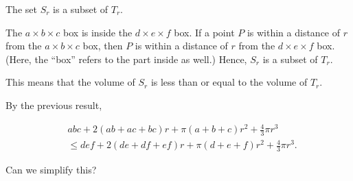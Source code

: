 




The set $S_r$ is a subset of $T_r$.

The $a \times b \times c$ box is inside the $d \times e \times f$ box. If a point $P$ is within a distance of $r$ from the $a \times b \times c$ box, then $P$ is within a distance of $r$ from the $d \times e \times f$ box. (Here, the ``box'' refers to the part inside as well.) Hence, $S_r$ is a subset of $T_r$.

This means that the volume of $S_r$ is less than or equal to the volume of $T_r$.

By the previous result,

\begin{equation*}  
\begin{split}  
&abc + 2(ab + ac + bc) r + \pi (a + b + c) r^2 + \frac{4}{3} \pi r^3 \\  
&\le def + 2(de + df + ef) r + \pi (d + e + f) r^2 + \frac{4}{3} \pi r^3.  
\end{split}  
\end{equation*}

Can we simplify this?






